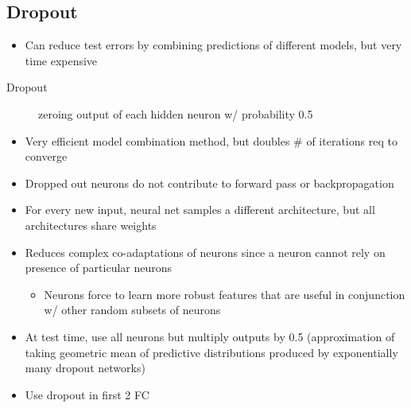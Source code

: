 \documentclass[a4paper,12pt]{article}
\begin{document}
\subsection{Dropout}
\begin{itemize}
  \item Can reduce test errors by combining predictions of different models, but very time expensive
\end{itemize}
\begin{description}
  \item[Dropout] zeroing output of each hidden neuron w/ probability 0.5
\end{description}
\begin{itemize}
  \item Very efficient model combination method, but doubles \# of iterations req to converge
  \item Dropped out neurons do not contribute to forward pass or backpropagation
  \item For every new input, neural net samples a different architecture, but all architectures share weights
  \item Reduces complex co-adaptations of neurons since a neuron cannot rely on presence of particular neurons
  \begin{itemize}
    \item Neurons force to learn more robust features that are useful in conjunction w/ other random subsets of neurons
  \end{itemize}
  \item At test time, use all neurons but multiply outputs by 0.5 (approximation of taking geometric mean of predictive distributions produced by exponentially many dropout networks)
  \item Use dropout in first 2 FC
\end{itemize}
\end{document}
